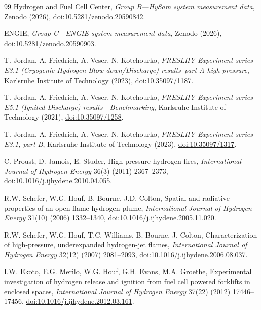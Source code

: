 \documentclass[12pt,a4paper]{article}
\begin{document}
\begin{thebibliography}{99}
Hydrogen and Fuel Cell Center, \textit{Group B---HySam system measurement data},
Zenodo (2026),
\href{https://doi.org/10.5281/zenodo.20590842}{doi:10.5281/zenodo.20590842}.

ENGIE, \textit{Group C---ENGIE system measurement data}, Zenodo (2026),
\href{https://doi.org/10.5281/zenodo.20590903}{doi:10.5281/zenodo.20590903}.

T. Jordan, A. Friedrich, A. Veser, N. Kotchourko, \textit{PRESLHY Experiment
series E3.1 (Cryogenic Hydrogen Blow-down/Discharge) results--part A high
pressure}, Karlsruhe Institute of Technology (2023),
\href{https://doi.org/10.35097/1187}{doi:10.35097/1187}.

T. Jordan, A. Friedrich, A. Veser, N. Kotchourko, \textit{PRESLHY Experiment
series E5.1 (Ignited Discharge) results---Benchmarking}, Karlsruhe Institute of
Technology (2021),
\href{https://doi.org/10.35097/1258}{doi:10.35097/1258}.

T. Jordan, A. Friedrich, A. Veser, N. Kotchourko, \textit{PRESLHY Experiment
series E3.1, part B}, Karlsruhe Institute of Technology (2023),
\href{https://doi.org/10.35097/1317}{doi:10.35097/1317}.

C. Proust, D. Jamois, E. Studer, High pressure hydrogen fires,
\textit{International Journal of Hydrogen Energy} 36(3) (2011) 2367--2373,
\href{https://doi.org/10.1016/j.ijhydene.2010.04.055}{doi:10.1016/j.ijhydene.2010.04.055}.

R.W. Schefer, W.G. Houf, B. Bourne, J.D. Colton, Spatial and radiative properties
of an open-flame hydrogen plume, \textit{International Journal of Hydrogen
Energy} 31(10) (2006) 1332--1340,
\href{https://doi.org/10.1016/j.ijhydene.2005.11.020}{doi:10.1016/j.ijhydene.2005.11.020}.

R.W. Schefer, W.G. Houf, T.C. Williams, B. Bourne, J. Colton,
Characterization of high-pressure, underexpanded hydrogen-jet flames,
\textit{International Journal of Hydrogen Energy} 32(12) (2007) 2081--2093,
\href{https://doi.org/10.1016/j.ijhydene.2006.08.037}{doi:10.1016/j.ijhydene.2006.08.037}.

I.W. Ekoto, E.G. Merilo, W.G. Houf, G.H. Evans, M.A. Groethe,
Experimental investigation of hydrogen release and ignition from fuel cell
powered forklifts in enclosed spaces, \textit{International Journal of Hydrogen
Energy} 37(22) (2012) 17446--17456,
\href{https://doi.org/10.1016/j.ijhydene.2012.03.161}{doi:10.1016/j.ijhydene.2012.03.161}.


\end{thebibliography}
\end{document}
